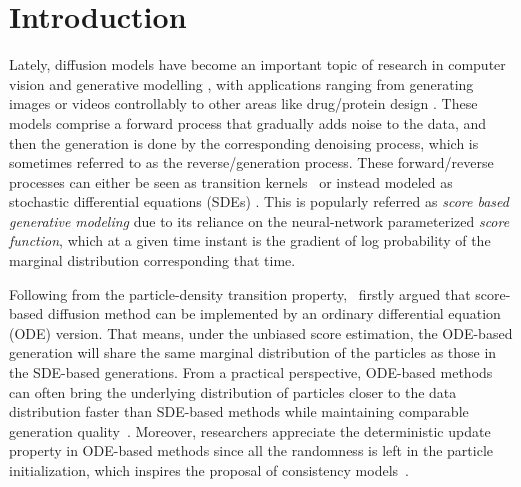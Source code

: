 \documentclass[11pt]{article}
\newcommand{\xh}[1]{\textcolor[HTML]{66CCFF}{#1}}
\begin{document}
\section{Introduction}
Lately, diffusion models \cite{sohl2015deep} have become an important topic of research in computer vision and generative modelling \cite{song2019generative, croitoru2023diffusion, lugmayr2022repaint, song2020denoising, nichol2021glide, song2021maximum, ho2020denoising}, with applications ranging from generating images or videos \cite{epstein2023diffusion, chen2023control} controllably to other areas like drug/protein design \cite{gruver2023protein, guo2024diffusion}. These models comprise a forward process that gradually adds noise to the data, and then the generation is done by the corresponding denoising process, which is sometimes referred to as the reverse/generation process.
These forward/reverse processes can either be seen as transition kernels \cite{huang2024reverse, song2020denoising, ho2020denoising}\ or instead modeled as stochastic differential equations (SDEs) \cite{song2020score, song2020sliced, song2021maximum, chen2022sampling}. 
This is popularly referred as \textit{score based generative modeling} due to its reliance on the neural-network parameterized \textit{score function}, which at a given time instant is the gradient of log probability of the marginal distribution corresponding that time.

Following from the particle-density transition property,~\cite{song2020score} firstly argued that score-based diffusion method can be implemented by an ordinary differential equation (ODE) version.
That means, under the unbiased score estimation, the ODE-based generation will share the same marginal distribution of the particles as those in the SDE-based generations.
From a practical perspective, ODE-based methods can often bring the underlying distribution of particles closer to the data distribution faster than SDE-based methods while maintaining comparable generation quality~\cite{lu2022dpm, zhou2024fast, zhang2022fast}.
Moreover, researchers appreciate the deterministic update property in ODE-based methods since all the randomness is left in the particle initialization, which inspires the proposal of consistency models~\cite{song2023consistency}.
\end{document}
